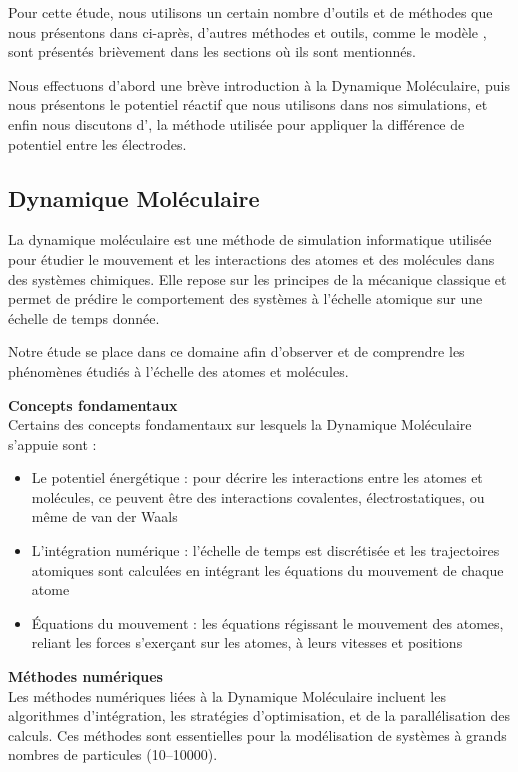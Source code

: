 Pour cette étude, nous utilisons un certain nombre d'outils et de méthodes que nous présentons dans ci-après, d'autres méthodes et outils, comme le modèle \spce{}, sont présentés brièvement dans les sections où ils sont mentionnés.

Nous effectuons d'abord une brève introduction à la Dynamique Moléculaire, puis nous présentons \reaxff{} le potentiel réactif que nous utilisons dans nos simulations, et enfin nous discutons d'\echemdid{}, la méthode utilisée pour appliquer la différence de potentiel entre les électrodes.

    \subsection{Dynamique Moléculaire}

La dynamique moléculaire est une méthode de simulation informatique utilisée pour étudier le mouvement et les interactions des atomes et des molécules dans des systèmes chimiques. Elle repose sur les principes de la mécanique classique et permet de prédire le comportement des systèmes à l'échelle atomique sur une échelle de temps donnée.

Notre étude se place dans ce domaine afin d'observer et de comprendre les phénomènes étudiés à l'échelle des atomes et molécules.

\textbf{Concepts fondamentaux}\\
Certains des concepts fondamentaux sur lesquels la Dynamique Moléculaire s'appuie sont :
\begin{itemize}
    \item Le potentiel énergétique : pour décrire les interactions entre les atomes et molécules, ce peuvent être des interactions covalentes, électrostatiques, ou même de van der Waals
    \item L'intégration numérique : l'échelle de temps est discrétisée et les trajectoires atomiques sont calculées en intégrant les équations du mouvement de chaque atome
    \item Équations du mouvement : les équations régissant le mouvement des atomes, reliant les forces s'exerçant sur les atomes, à leurs vitesses et positions
\end{itemize}

\textbf{Méthodes numériques}\\
Les méthodes numériques liées à la Dynamique Moléculaire incluent les algorithmes d'intégration, les stratégies d'optimisation, et de la parallélisation des calculs. Ces méthodes sont essentielles pour la modélisation de systèmes à grands nombres de particules (\numrange{10}{10000}).

